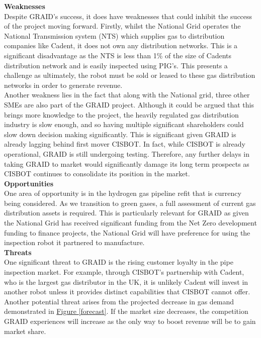 \documentclass[11pt]{article}		%
\newcommand{\figref}[1]{\hyperref[#1]{Figure \ref*{#1}}}    %
\begin{document}
	        \textbf{Weaknesses}\\
	        Despite GRAID’s success, it does have weaknesses that could inhibit the success of the project moving forward. Firstly, whilst the National Grid operates the National Transmission system (NTS) which supplies gas to distribution companies like Cadent, it does not own any distribution networks. This is a significant disadvantage as the NTS is less than 1\% of the size of Cadents distribution network and is easily inspected using PIG’s. This presents a challenge as ultimately, the robot must be sold or leased to these gas distribution networks in order to generate revenue. \\
	        \hspace*{3ex}Another weakness lies in the fact that along with the National grid, three other SMEs are also part of the GRAID project. Although it could be argued that this brings more knowledge to the project, the heavily regulated gas distribution industry is slow enough, and so having multiple significant shareholders could slow down decision making significantly. This is significant given GRAID is already lagging behind first mover CISBOT. In fact, while CISBOT is already operational, GRAID is still undergoing testing. Therefore, any further delays in taking GRAID to market would significantly damage its long term prospects as CISBOT continues to consolidate its position in the market. \\
	        \textbf{Opportunities}\\
	        One area of opportunity is in the hydrogen gas pipeline refit that is currency being considered. As we transition to green gases, a full assessment of current gas distribution assets is required. This is particularly relevant for GRAID as given the National Grid has received significant funding from the Net Zero development funding to finance projects, the National Grid will have preference for using the inspection robot it partnered to manufacture. \\
	        \textbf{Threats} \\
	        One significant threat to GRAID is the rising customer loyalty in the pipe inspection market. For example, through CISBOT's partnership with Cadent, who is the largest gas distributor in the UK, it is unlikely Cadent will invest in another robot unless it provides distinct capabilities that CISBOT cannot offer. Another potential threat arises from the projected decrease in gas demand demonstrated in \figref{forecast}. If the market size decreases, the competition GRAID experiences will increase as the only way to boost revenue will be to gain market share.
	        
\end{document}
